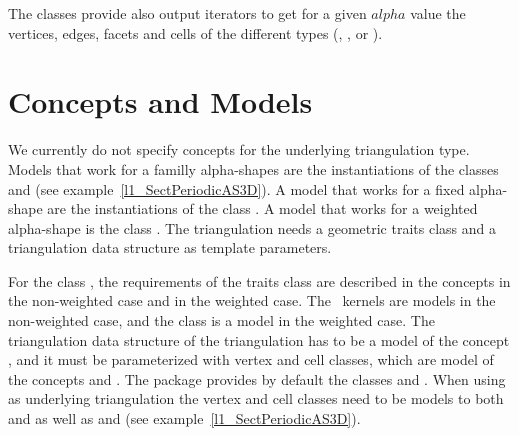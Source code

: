 The classes provide also output iterators  to  get for a given $alpha$ value
the vertices, edges, facets and cells of the different types
(, ,  or 
).



\section{Concepts and Models\label{I1_SectDtClass3D}}


We currently do not specify concepts for the underlying triangulation
type. Models that work for a familly alpha-shapes are the instantiations
of the classes  and
 (see
example~\ref{l1_SectPeriodicAS3D}). A model that works for a fixed alpha-shape are the instantiations
of the class .
A model that works for a weighted alpha-shape is 
the class . The triangulation needs a geometric traits class 
and a triangulation data structure as template parameters.

For the class , the requirements of
the traits class are described in the concepts 
in the non-weighted case and  in the weighted case.
The \cgal\ kernels are models in the non-weighted case, and 
the class  is a model
in the weighted case.
The triangulation data structure of the triangulation
has to be a model of the concept ,
and it must be parameterized with vertex and cell classes, which are model of the concepts
 and .
The package provides by default the classes
 and
. When using
 as underlying
triangulation the vertex and cell classes need to be models to both
 and
 as well as
 and 
(see example~\ref{l1_SectPeriodicAS3D}). 



